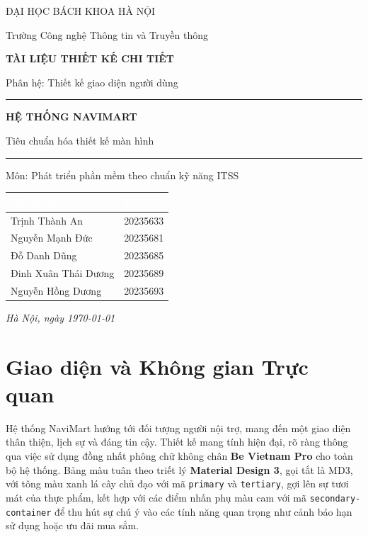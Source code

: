 \documentclass[12pt,a4paper]{article}
\newcommand{\code}[1]{\texttt{#1}}
\newcommand{\thead}[1]{\textbf{\textcolor{white}{#1}}}
\begin{document}
\begin{titlepage}
\centering
\vspace*{1.2cm}
{\large ĐẠI HỌC BÁCH KHOA HÀ NỘI\par}
{\large Trường Công nghệ Thông tin và Truyền thông\par}
\vspace{2.4cm}
{\large\bfseries TÀI LIỆU THIẾT KẾ CHI TIẾT\par}
{\normalsize Phân hệ: Thiết kế giao diện người dùng\par}
\vspace{1.4cm}
\rule{0.8\linewidth}{0.4pt}\par
\vspace{0.6cm}
{\Huge\bfseries\color{navy} HỆ THỐNG NAVIMART\par}
\vspace{0.5cm}
{\large Tiêu chuẩn hóa thiết kế màn hình\par}
\vspace{0.4cm}
\rule{0.8\linewidth}{0.4pt}\par
\vspace{1.2cm}
{\large Môn: Phát triển phần mềm theo chuẩn kỹ năng ITSS\par}
\vspace{2cm}

\begin{tabular}{|l|l|}
\hline
\rowcolor{headerblue}
\thead{Họ và tên} & \thead{MSSV} \\
\hline
\rule{0pt}{2.4ex} Trịnh Thành An  & 20235633\\
\hline
\rule{0pt}{2.4ex} Nguyễn Mạnh Đức  & 20235681\\
\hline
\rule{0pt}{2.4ex} Đỗ Danh Dũng  & 20235685\\
\hline
\rule{0pt}{2.4ex} Đinh Xuân Thái Dương  & 20235689\\
\hline
\rule{0pt}{2.4ex}Nguyễn Hồng Dương   & 20235693\\
\hline
\end{tabular}

\vfill
{\itshape Hà Nội, ngày \today\par}
\end{titlepage}

\tableofcontents
\newpage

\section{Giao diện và Không gian Trực quan}
Hệ thống NaviMart hướng tới đối tượng người nội trợ, mang đến một giao diện thân thiện, lịch sự và đáng tin cậy. Thiết kế mang tính hiện đại, rõ ràng thông qua việc sử dụng đồng nhất phông chữ không chân \textbf{Be Vietnam Pro} cho toàn bộ hệ thống. Bảng màu tuân theo triết lý \textbf{Material Design 3}, gọi tắt là MD3, với tông màu xanh lá cây chủ đạo với mã \code{primary} và \code{tertiary}, gợi lên sự tươi mát của thực phẩm, kết hợp với các điểm nhấn phụ màu cam với mã \code{secondary-container} để thu hút sự chú ý vào các tính năng quan trọng như cảnh báo hạn sử dụng hoặc ưu đãi mua sắm.
\end{document}
